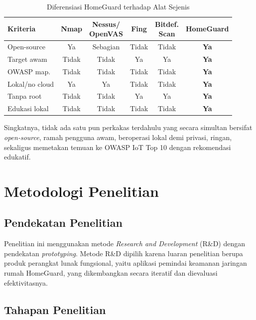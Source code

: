 \documentclass[conference]{IEEEtran}
\begin{document}
\begin{table}[htbp]
\caption{Diferensiasi HomeGuard terhadap Alat Sejenis}
\label{tab:diferensiasi}
\renewcommand{\arraystretch}{1.2}
\begin{tabular}{|l|c|c|c|c|c|}
\hline
\textbf{Kriteria} & \textbf{Nmap} & \makecell{\textbf{Nessus/}\\\textbf{OpenVAS}} & \textbf{Fing} & \makecell{\textbf{Bitdef.}\\\textbf{Scan}} & \textbf{HomeGuard} \\
\hline
Open-source & Ya & Sebagian & Tidak & Tidak & \textbf{Ya} \\
\hline
Target awam & Tidak & Tidak & Ya & Ya & \textbf{Ya} \\
\hline
OWASP map. & Tidak & Tidak & Tidak & Tidak & \textbf{Ya} \\
\hline
Lokal/no cloud & Ya & Ya & Tidak & Tidak & \textbf{Ya} \\
\hline
Tanpa root & Tidak & Tidak & Ya & Ya & \textbf{Ya} \\
\hline
Edukasi lokal & Tidak & Tidak & Tidak & Tidak & \textbf{Ya} \\
\hline
\end{tabular}
\end{table}

Singkatnya, tidak ada satu pun perkakas terdahulu yang secara simultan bersifat \textit{open-source}, ramah pengguna awam, beroperasi lokal demi privasi, ringan, sekaligus memetakan temuan ke OWASP IoT Top 10 dengan rekomendasi edukatif.

\section{Metodologi Penelitian}

\subsection{Pendekatan Penelitian}

Penelitian ini menggunakan metode \textit{Research and Development} (R\&D) dengan pendekatan \textit{prototyping}. Metode R\&D dipilih karena luaran penelitian berupa produk perangkat lunak fungsional, yaitu aplikasi pemindai keamanan jaringan rumah HomeGuard, yang dikembangkan secara iteratif dan dievaluasi efektivitasnya.

\subsection{Tahapan Penelitian}
\end{document}
